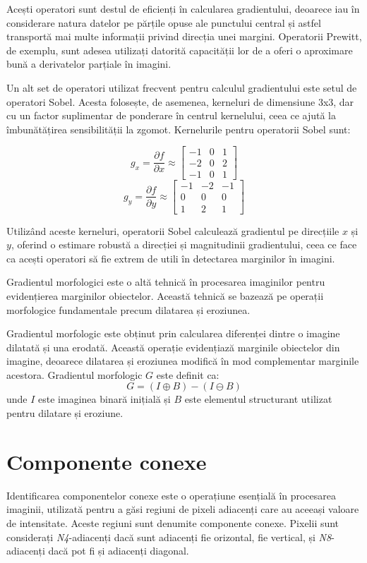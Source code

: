 \documentclass[a4paper,12pt]{report}
\begin{document}
Acești operatori sunt destul de eficienți în calcularea gradientului, deoarece iau în considerare natura datelor pe părțile opuse ale punctului central și astfel transportă mai multe informații privind direcția unei margini. Operatorii Prewitt, de exemplu, sunt adesea utilizați datorită capacității lor de a oferi o aproximare bună a derivatelor parțiale în imagini.

Un alt set de operatori utilizat frecvent pentru calculul gradientului este setul de operatori Sobel. Acesta folosește, de asemenea, kerneluri de dimensiune 3x3, dar cu un factor suplimentar de ponderare în centrul kernelului, ceea ce ajută la îmbunătățirea sensibilității la zgomot. Kernelurile pentru operatorii Sobel sunt:

\[
    g_x = \frac{\partial f}{\partial x} \approx
    \begin{bmatrix}
        -1 & 0 & 1 \\
        -2 & 0 & 2 \\
        -1 & 0 & 1
    \end{bmatrix}
\]
\[
    g_y = \frac{\partial f}{\partial y} \approx
    \begin{bmatrix}
        -1 & -2 & -1 \\
        0  & 0  & 0  \\
        1  & 2  & 1
    \end{bmatrix}
\]

Utilizând aceste kerneluri, operatorii Sobel calculează gradientul pe direcțiile \( x \) și \( y \), oferind o estimare robustă a direcției și magnitudinii gradientului, ceea ce face ca acești operatori să fie extrem de utili în detectarea marginilor în imagini.

Gradientul morfologici este o altă tehnică în procesarea imaginilor pentru evidențierea marginilor obiectelor. Această tehnică se bazează pe operații morfologice fundamentale precum dilatarea și eroziunea.

Gradientul morfologic este obținut prin calcularea diferenței dintre o imagine dilatată și una erodată. Această operație evidențiază marginile obiectelor din imagine, deoarece dilatarea și eroziunea modifică în mod complementar marginile acestora. Gradientul morfologic \( G \) este definit ca:
\[
    G = (I \oplus B) - (I \ominus B)
\]
unde \( I \) este imaginea binară inițială și \( B \) este elementul structurant utilizat pentru dilatare și eroziune.

\section{Componente conexe}
Identificarea componentelor conexe este o operațiune esențială în procesarea imaginii, utilizată pentru a găsi regiuni de pixeli adiacenți care au aceeași valoare de intensitate. Aceste regiuni sunt denumite componente conexe. Pixelii sunt considerați \textit{N4}-adiacenți dacă sunt adiacenți fie orizontal, fie vertical, și \textit{N8}-adiacenți dacă pot fi și adiacenți diagonal.
\end{document}
